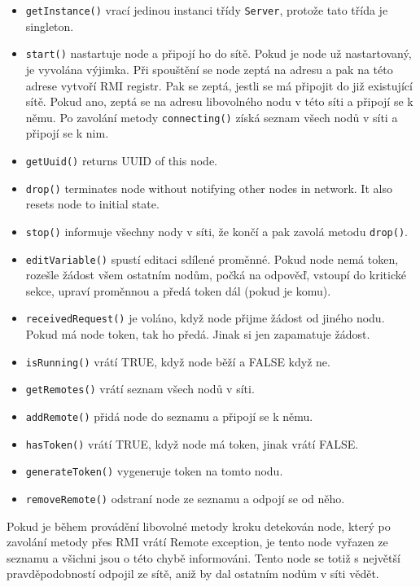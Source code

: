 \documentclass[11pt]{scrartcl}
\begin{document}
    \begin{itemize}
        \item \texttt{getInstance()} vrací jedinou instanci třídy \texttt{Server}, protože tato třída je singleton.
        \item \texttt{start()} nastartuje node a připojí ho do sítě. Pokud je node už nastartovaný, je vyvolána
        výjimka. Při spouštění se node zeptá na adresu a pak na této adrese vytvoří RMI registr. Pak se zeptá, jestli
        se má připojit do již existující sítě. Pokud ano, zeptá se na adresu libovolného nodu v této síti a připojí
        se k němu. Po zavolání metody \texttt{connecting()} získá seznam všech nodů v síti a připojí se k nim.
        \item \texttt{getUuid()} returns UUID of this node.
        \item \texttt{drop()} terminates node without notifying other nodes in network. It also resets node to 
        initial state.
        \item \texttt{stop()} informuje všechny nody v síti, že končí a pak zavolá metodu \texttt{drop()}.
        \item \texttt{editVariable()} spustí editaci sdílené proměnné. Pokud node nemá token, rozešle žádost všem 
        ostatním nodům, počká na odpověď, vstoupí do kritické sekce, upraví proměnnou a předá token dál (pokud je komu).
        \item \texttt{receivedRequest()} je voláno, když node přijme žádost od jiného nodu. Pokud má node token, tak 
        ho předá. Jinak si jen zapamatuje žádost.
        \item \texttt{isRunning()} vrátí TRUE, když node běží a FALSE když ne.
        \item \texttt{getRemotes()} vrátí seznam všech nodů v síti.
        \item \texttt{addRemote()} přidá node do seznamu a připojí se k němu.
        \item \texttt{hasToken()} vrátí TRUE, když node má token, jinak vrátí FALSE.
        \item \texttt{generateToken()} vygeneruje token na tomto nodu.
        \item \texttt{removeRemote()} odstraní node ze seznamu a odpojí se od něho.
    \end{itemize}

    Pokud je během provádění libovolné metody kroku detekován node, který po zavolání metody přes RMI vrátí Remote
    exception, je tento node vyřazen ze seznamu a všichni jsou o této chybě informováni. Tento node se totiž s
    největší pravděpodobností odpojil ze sítě, aniž by dal ostatním nodům v síti vědět.
\end{document}
